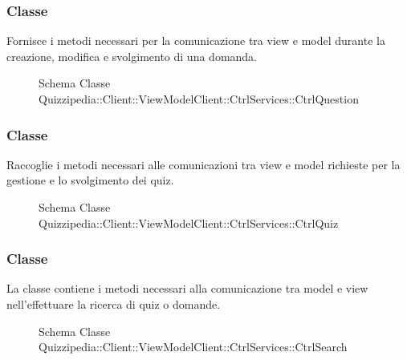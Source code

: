 \subsubsection{Classe }
Fornisce i metodi necessari per la comunicazione tra view e model durante la creazione, modifica e svolgimento di una domanda.
\begin{figure}[H]
\centering
\noindent{}
\caption[Schema Classe CtrlQuestion]{Schema Classe Quizzipedia::Client::ViewModelClient::CtrlServices::CtrlQuestion}
\end{figure}
\subsubsection{Classe }
Raccoglie i metodi necessari alle comunicazioni tra view e model richieste per la gestione e lo svolgimento dei quiz.
\begin{figure}[H]
\centering
\noindent{}
\caption[Schema Classe CtrlQuiz]{Schema Classe Quizzipedia::Client::ViewModelClient::CtrlServices::CtrlQuiz}
\end{figure}
\subsubsection{Classe }
La classe contiene i metodi necessari alla comunicazione tra model e view nell'effettuare la ricerca di quiz o domande.
\begin{figure}[H]
\centering
\noindent{}
\caption[Schema Classe CtrlSearch]{Schema Classe Quizzipedia::Client::ViewModelClient::CtrlServices::CtrlSearch}
\end{figure}
